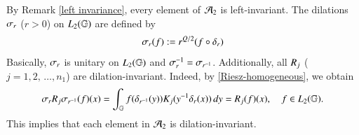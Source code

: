 \documentclass[leqno]{amsart}
\begin{document}
	
	
	By Remark \ref{left invariance}, every element of ${\mathcal A}_2$ is left-invariant. The dilations $\sigma_{r}$ ($r>0$) on $L_{2}(\mathbb{G})$ are defined by
	\begin{align*}
		\sigma_{r}(f):=r^{Q/2}(f\circ \delta_{r})
	\end{align*}
	Basically, $\sigma_{r}$ is unitary on $L_{2}(\mathbb{G})$ and $\sigma_{r}^{-1}=\sigma_{r^{-1}}$. 
	Additionally, all ${ R}_{j}$ ($j=1,2,\,\dotsc,n_{1}$) are dilation-invariant. 
	Indeed, %
	by \eqref{Riesz-homogeneous}, we obtain
	\begin{align*}
		\sigma_{r} { R}_{j} \sigma_{r^{-1}}(f)(x)=\int_{\mathbb{G}}f(\delta_{r^{-1}}(y))K_{j}(y^{-1}\delta_{r}(x))\,dy
		={ R}_{j}(f)(x),\quad f\in L_{2}(\mathbb{G}).
	\end{align*}
	This implies that each element in ${\mathcal A}_{2}$ is dilation-invariant.
	
	
	
	
	\medskip
	
	
\end{document}
